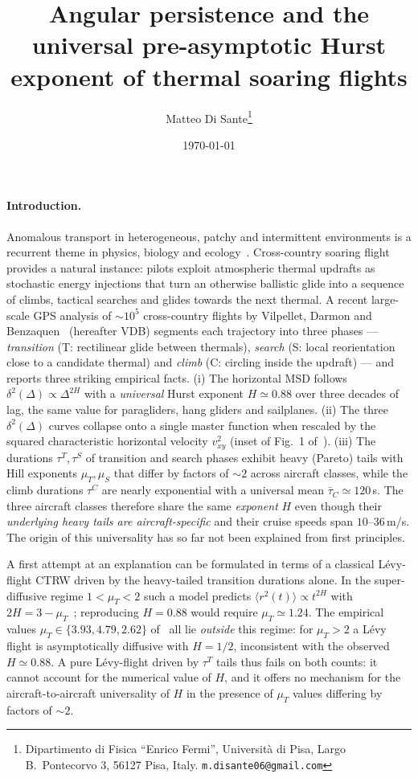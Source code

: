 \documentclass[10pt,twocolumn,a4paper]{article}
\title{Angular persistence and the universal pre-asymptotic Hurst
       exponent of thermal soaring flights}
\author{Matteo Di Sante\thanks{Dipartimento di Fisica
``Enrico Fermi'', Universit\`a di Pisa, Largo B.~Pontecorvo 3,
56127 Pisa, Italy. \texttt{m.disante06@gmail.com}}}
\date{\today}
\makeatletter
\renewcommand{\maketitle}{%
  \twocolumn[%
    \begin{@twocolumnfalse}
      \begin{center}
        {\Large\bfseries \@title\par}\vskip 6pt
        {\normalsize \@author\par}\vskip 4pt
        {\small \@date\par}\vskip 10pt
      \end{center}
      \begin{quotation}\noindent\small\textbf{Abstract.}\ \@abstract\end{quotation}
      \vskip 10pt
    \end{@twocolumnfalse}%
  ]%
}
\makeatother
\begin{document}
\maketitle

\paragraph*{Introduction.}
Anomalous transport in heterogeneous, patchy and intermittent
environments is a recurrent theme in physics, biology and
ecology~\cite{metzler2000,zaburdaev2015,codling2008,benichou2011}.
Cross-country soaring flight provides a natural instance: pilots
exploit atmospheric thermal updrafts as stochastic energy
injections that turn an otherwise ballistic glide into a sequence
of climbs, tactical searches and glides towards the next thermal.
A recent large-scale GPS analysis of $\sim 10^5$ cross-country
flights by Vilpellet, Darmon and
Benzaquen~\cite{vilpellet2026} (hereafter VDB) segments each
trajectory into three phases --- \emph{transition} (T: rectilinear
glide between thermals), \emph{search} (S: local reorientation
close to a candidate thermal) and \emph{climb} (C: circling inside
the updraft) --- and reports three striking empirical facts.
(i) The horizontal MSD follows
$\delta^2(\Delta)\propto\Delta^{2H}$ with a \emph{universal} Hurst
exponent $H\simeq 0.88$ over three decades of lag, the same value
for paragliders, hang gliders and sailplanes. (ii) The three
$\delta^2(\Delta)$ curves collapse onto a single master function
when rescaled by the squared characteristic horizontal velocity
$v_{xy}^2$ (inset of Fig.~1 of~\cite{vilpellet2026}). (iii) The
durations $\tau^T,\tau^S$ of transition and search phases exhibit
heavy (Pareto) tails with Hill exponents $\mu_T,\mu_S$ that differ
by factors of $\sim 2$ across aircraft classes, while the climb
durations $\tau^C$ are nearly exponential with a universal mean
$\bar{\tau}_C\simeq 120$\,s. The three aircraft classes therefore
share the same \emph{exponent} $H$ even though their
\emph{underlying heavy tails are aircraft-specific} and their
cruise speeds span $10$--$36$\,m/s. The origin of this universality
has so far not been explained from first principles.

A first attempt at an explanation can be formulated in terms of a
classical L\'evy-flight CTRW driven by the heavy-tailed transition
durations alone. In the super-diffusive regime $1<\mu_T<2$ such a
model predicts $\langle r^2(t)\rangle\propto t^{2H}$ with
$2H=3-\mu_T$~\cite{zaburdaev2015}; reproducing $H=0.88$ would
require $\mu_T\simeq 1.24$. The empirical values
$\mu_T\in\{3.93,4.79,2.62\}$ of~\cite{vilpellet2026} all lie
\emph{outside} this regime: for $\mu_T>2$ a L\'evy flight is
asymptotically diffusive with $H=1/2$, inconsistent with the
observed $H\simeq 0.88$. A pure L\'evy-flight driven by $\tau^T$
tails thus fails on both counts: it cannot account for the
numerical value of $H$, and it offers no mechanism for the
aircraft-to-aircraft universality of $H$ in the presence of
$\mu_T$ values differing by factors of $\sim 2$.
\end{document}
